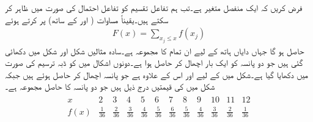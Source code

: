 فرض کریں کہ  ایک منفصل متغیر ہے۔تب ہم تفاعل تقسیم  کو تفاعل احتمال  کی صورت میں ظاہر کر سکتے ہیں۔یقیناً  مساوات  ( اور  کے ساتھ) پر کرتے ہوئے
\begin{align}\label{مساوات_شماریات_غیر_مسلسل_متغیر_ج}
F(x)=\sum_{x_j\le x} f(x_j)
\end{align}
حاصل ہو گا جہاں دایاں ہاتھ  کے لیے ان تمام  کا مجموعہ ہے۔سادہ مثالیں شکل  اور شکل  میں دکھائی گئی ہیں جو دو پانسہ کو ایک بار اچھال کر حاصل ہوا ہے۔دونوں اشکال میں  کو ڈبہ ترسیم کی صورت میں دکھایا گیا ہے۔شکل  میں  کے لیے  اور  اس کے علاوہ  ہے جو پانسہ اچھال کر حاصل ہوئے ہیں  جبکہ شکل  میں  کی قیمتیں درج ذیل ہیں جو دو پانسہ کا حاصل مجموعہ ہے۔ 
\begin{align*}
\begin{array}{c|ccccccccccc}
x&2&3&4&5&6&7&8&9&10&11&12\\
\hline
f(x)&\frac{1}{36}&\frac{2}{36}&\frac{3}{36}&\frac{4}{36}&\frac{5}{36}&\frac{6}{36}&\frac{5}{36}&\frac{4}{36}&\frac{3}{36}&\frac{2}{36}&\frac{1}{36}
\end{array}
\end{align*}
%
